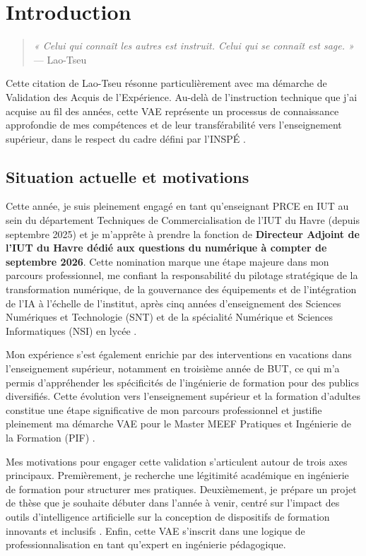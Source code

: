 \chapter{Introduction}

\begin{quote}
\textit{« Celui qui connaît les autres est instruit. Celui qui se connaît est sage. »} — Lao-Tseu
\end{quote}

Cette citation de Lao-Tseu résonne particulièrement avec ma démarche de Validation des Acquis de l'Expérience. Au-delà de l'instruction technique que j'ai acquise au fil des années, cette VAE représente un processus de connaissance approfondie de mes compétences et de leur transférabilité vers l'enseignement supérieur, dans le respect du cadre défini par l'INSPÉ \parencite{vademecum_vae_inspe}.

\section{Situation actuelle et motivations}

Cette année, je suis pleinement engagé en tant qu'enseignant PRCE en IUT au sein du département Techniques de Commercialisation de l'IUT du Havre (depuis septembre 2025) et je m'apprête à prendre la fonction de \textbf{Directeur Adjoint de l'IUT du Havre dédié aux questions du numérique à compter de septembre 2026}. Cette nomination marque une étape majeure dans mon parcours professionnel, me confiant la responsabilité du pilotage stratégique de la transformation numérique, de la gouvernance des équipements et de l'intégration de l'IA à l'échelle de l'institut, après cinq années d'enseignement des Sciences Numériques et Technologie (SNT) et de la spécialité Numérique et Sciences Informatiques (NSI) en lycée \parencite{eduscol_nsi,nsi_programmes}.

Mon expérience s'est également enrichie par des interventions en vacations dans l'enseignement supérieur, notamment en troisième année de BUT, ce qui m'a permis d'appréhender les spécificités de l'ingénierie de formation pour des publics diversifiés. Cette évolution vers l'enseignement supérieur et la formation d'adultes constitue une étape significative de mon parcours professionnel et justifie pleinement ma démarche VAE pour le Master MEEF Pratiques et Ingénierie de la Formation (PIF) \parencite{unicaen}.

Mes motivations pour engager cette validation s'articulent autour de trois axes principaux. Premièrement, je recherche une légitimité académique en ingénierie de formation pour structurer mes pratiques. Deuxièmement, je prépare un projet de thèse que je souhaite débuter dans l'année à venir, centré sur l'impact des outils d'intelligence artificielle sur la conception de dispositifs de formation innovants et inclusifs \parencite{intelligence_artificielle_education}. Enfin, cette VAE s'inscrit dans une logique de professionnalisation en tant qu'expert en ingénierie pédagogique.

